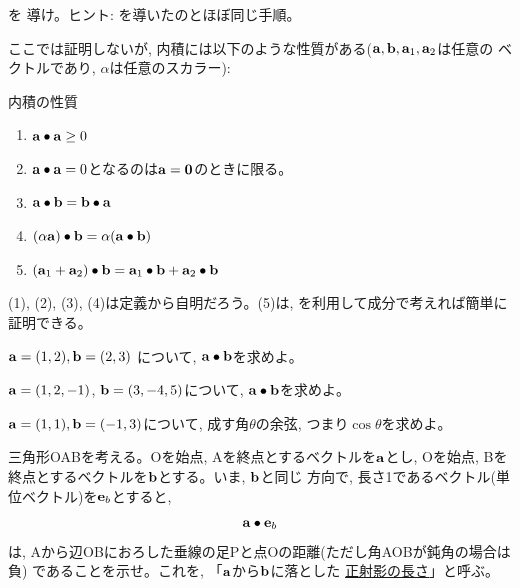 \begin{q}\label{q:vect_inprod_coord_3D} を
導け。ヒント: を導いたのとほぼ同じ手順。
\end{q}\hv


ここでは証明しないが, 内積には以下のような性質がある(${\bf a}, {\bf b}, {\bf a}_1, {\bf a}_2$は任意の
ベクトルであり, $\alpha$は任意のスカラー):
\begin{itembox}{内積の性質}
\begin{enumerate}
\item ${\bf a}\bullet{\bf a} \geq 0$
\item ${\bf a}\bullet{\bf a} = 0$となるのは${\bf a} = {\bf 0}$のときに限る。
\item ${\bf a}\bullet{\bf b} = {\bf b}\bullet{\bf a}$ 
\item $(\alpha{\bf a})\bullet{\bf b} = \alpha({\bf a}\bullet{\bf b})$
\item $({\bf a}_1+{\bf a}_2)\bullet{\bf b} = {\bf a}_1\bullet{\bf b}+{\bf a}_2\bullet{\bf b}$
\end{enumerate}
\end{itembox}
(1), (2), (3), (4)は定義から自明だろう。(5)は, 
を利用して成分で考えれば簡単に証明できる。\hv


\begin{q}\label{q:vect_inprod_coord2D} ${\bf a}=(1,2), {\bf b}=(2,3)$
について, ${\bf a}\bullet{\bf b}$を求めよ。
\end{q}
\hv

\begin{q}\label{q:vect_3D_inprod} ${\bf a}=(1, 2, -1)$, ${\bf b}=(3, -4, 5)$について, 
${\bf a}\bullet{\bf b}$を求めよ。
\end{q}\hv

\begin{q}\label{q:vect_inprod_angle_coord2D} ${\bf a}=(1,1), {\bf b}=(-1,3)$について, 成す角$\theta$の余弦, つまり$\cos \theta$を求めよ。
\end{q}\hv

\begin{q}\label{q:vect_inprod_shadow2D} 三角形OABを考える。Oを始点, Aを終点とするベクトルを${\bf a}$とし, 
Oを始点, Bを終点とするベクトルを${\bf b}$とする。いま, ${\bf b}$と同じ
方向で, 長さ1であるベクトル(単位ベクトル)を${\bf e}_b$とすると, 
\begin{eqnarray}
{\bf a}\bullet{\bf e}_b
\end{eqnarray}
は, Aから辺OBにおろした垂線の足Pと点Oの距離(ただし角AOBが鈍角の場合は負)
であることを示せ。これを, 「${\bf a}$から${\bf b}$に落とした
\underline{正射影の長さ}」と呼ぶ。
\end{q}\hv


